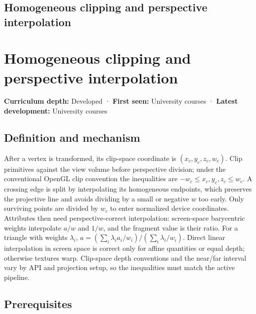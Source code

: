 \hypertarget{appendix-40426e4b2103}{}
\section*{Homogeneous clipping and perspective interpolation}
\chapter{Homogeneous clipping and perspective interpolation}\label{appendix-40426e4b2103-homogeneous-clipping-and-perspective-interpolation}

\textbf{Curriculum depth:} Developed · \textbf{First seen:} University courses · \textbf{Latest development:} University courses

\section{Definition and mechanism}\label{appendix-40426e4b2103-definition-and-mechanism}

After a vertex is transformed, its clip-space coordinate is \((x_c,y_c,z_c,w_c)\). Clip primitives against the view volume before perspective division; under the conventional OpenGL clip convention the inequalities are \(-w_c\le x_c,y_c,z_c\le w_c\). A crossing edge is split by interpolating its homogeneous endpoints, which preserves the projective line and avoids dividing by a small or negative \(w\) too early. Only surviving points are divided by \(w_c\) to enter normalized device coordinates. Attributes then need perspective-correct interpolation: screen-space barycentric weights interpolate \(a/w\) and \(1/w\), and the fragment value is their ratio. For a triangle with weights \(\lambda_i\), \(a=(\sum_i\lambda_i a_i/w_i)/(\sum_i\lambda_i/w_i)\). Direct linear interpolation in screen space is correct only for affine quantities or equal depth; otherwise textures warp. Clip-space depth conventions and the near/far interval vary by API and projection setup, so the inequalities must match the active pipeline.

\section{Prerequisites}\label{appendix-40426e4b2103-prerequisites}

